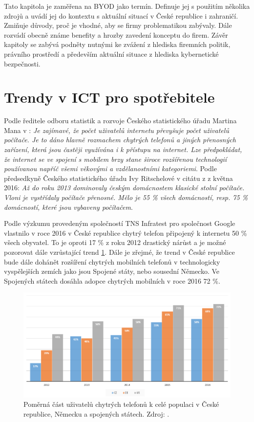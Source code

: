 Tato kapitola je zaměřena na BYOD jako termín. Definuje jej s použitím několika zdrojů a uvádí jej do kontextu s aktuální situací v České republice i zahraničí. Zmiňuje důvody, proč je vhodné, aby se firmy problematikou zabývaly. Dále rozvádí obecně známe benefity a hrozby zavedení konceptu do firem. Závěr kapitoly se zabývá podněty nutnými ke zvážení z hlediska firemních politik, právního prostředí a především aktuální situace z hlediska kybernetické bezpečnosti.  

\section{Trendy v ICT pro spotřebitele}\label{trendy}

Podle ředitele odboru statistik a rozvoje Českého statistického úřadu Martina Mana v \cite{csu1}: \textit{Je zajímavé, že počet uživatelů internetu převyšuje počet uživatelů počítače. Je to dáno hlavně rozmachem chytrých telefonů a jiných přenosných zařízení, která jsou častěji využívána i k přístupu na internet. Lze předpokládat, že internet se ve spojení s mobilem brzy stane široce rozšířenou technologií používanou napříč všemi věkovými a vzdělanostními  kategoriemi}. Podle předsedkyně Českého statistického úřadu Ivy Ritschelové v citátu z \cite{csu1} z května 2016: \textit{Až do roku 2013 dominovaly českým domácnostem klasické stolní počítače. Vloni je vystřídaly počítače přenosné. Mělo je 55 \% všech domácností, resp. 75 \% domácností, které jsou vybaveny počítačem}.

Podle výzkumu provedeným společností TNS Infratest pro společnost Google \cite{barometer} vlastnilo v roce 2016 v České republice chytrý telefon připojený k internetu 50 \% všech obyvatel. To je oproti 17 \% z roku 2012 drastický nárůst a je možné pozorovat dále vzrůstající trend \ref{uzivateleSmartphone}. Dále je zřejmé, že trend v České republice bude dále dohánět rozšíření chytrých mobilních telefonů v technologicky vyspělejších zemích jako jsou Spojené státy, nebo sousední Německo. Ve Spojených státech dosáhla adopce chytrých mobilních v roce 2016 72 \%.

\begin{figure}[h!]\label{uzivateleSmartphone}
\centering
\includegraphics[width=13cm]{img/uzivateleSmartphone}
\caption{Poměrná část uživatelů chytrých telefonů k celé populaci v České republice, Německu a spojených státech. Zdroj: \cite{barometer}.} 
\end{figure}

